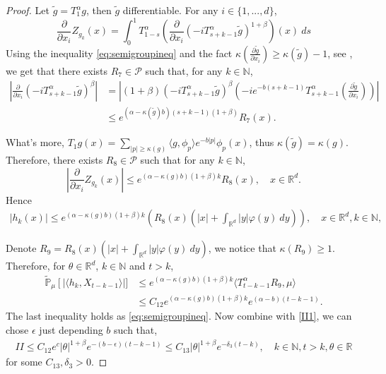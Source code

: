 \documentclass[12pt, a4paper]{amsart}
\theoremstyle{definition}
\numberwithin{equation}{section}
\begin{document}
\begin{proof}
    Let $\tilde{g}=T_1^{\alpha}g $, then $\tilde{g}$ differentiable. For any $i \in \{1,...,d\}$,
    $$\frac{\partial}{\partial x_i}Z_{g_k}(x)=\int_0^1 T^{\alpha}_{1-s}\left(\frac{\partial}{\partial x_i}(-i T_{s+k-1}^{\alpha} \tilde{g})^{1+\beta}\right)(x)~ds$$
    Using the inequality \eqref{eq:semigroupineq} and the fact $\kappa\left(\frac{\partial \tilde{g}}{\partial x_i}\right)\geq \kappa(\tilde{g})-1$, see \cite[Lemma 2.3]{RSZ}, we get that there exists $R_7 \in \mathcal{P}$ such that, for any $k\in \mathbb{N}$,
    \begin{align*}
        \left|\frac{\partial}{\partial x_i}(-i T_{s+k-1}^{\alpha}\tilde{g})^{\beta}\right|&=\left|(1+\beta)(-i T_{s+k-1}^{\alpha}\tilde{g})^{\beta}(-i e^{-b(s+k-1)}T_{s+k-1}^{\alpha}\left(\frac{\partial \tilde{g}}{\partial x_i}\right))\right|\\
        &\leq e^{(\alpha-\kappa(\tilde{g})b)(s+k-1)(1+\beta)}R_7(x).
    \end{align*}

    What's more, $T_1 g(x)=\sum_{|p|\geq\kappa(g)}\langle g,\phi_p\rangle e^{-b|p|}\phi_p(x)$, thus $\kappa(\tilde{g})=\kappa(g)$. Therefore, there exists $R_8 \in \mathcal{P}$ such that for any $k\in \mathbb{N}$,
    $$\left|\frac{\partial}{\partial x_i}Z_{g_k}(x)\right|\leq e^{(\alpha-\kappa(g)b)(1+\beta)k}R_8(x),\quad x\in \mathbb{R}^d. $$
    Hence
\begin{align}
    |h_k(x)|\leq e^{(\alpha-\kappa(g)b)(1+\beta)k}(R_8(x)(|x|+\int_{\mathbb{R}^d}|y|\varphi(y)~dy)),\quad  x\in \mathbb{R}^d, k\in\mathbb{N},
\end{align}

Denote $R_9=R_8(x)(|x|+\int_{\mathbb{R}^d}|y|\varphi(y)~dy)$, we notice that $\kappa(R_9)\geq1$. Therefore, for $\theta\in \mathbb{R}^d$, $k\in\mathbb{N}$ and $t>k$,
\begin{align*}
  \mathbb{\tilde{P}}_{\mu}\left[|\langle h_k,X_{t-k-1}\rangle\right|]&\leq e^{(\alpha-\kappa(g)b)(1+\beta)k}\langle T_{t-k-1}^{\alpha}R_9,\mu\rangle\\
  &\leq C_{12} e^{(\alpha-\kappa(g)b)(1+\beta)k}e^{(\alpha-b)(t-k-1)}.
\end{align*}
 The last inequality holds as \eqref{eq:semigroupineq}. Now combine with \eqref{II1}, we can chose $\epsilon$ just depending $b$ such that,
\begin{align}
    II\leq C_{12} e^c|\theta|^{1+\beta} e^{-(b-\epsilon)(t-k-1)}\leq C_{13}|\theta|^{1+\beta}e^{-\delta_3(t-k)},\quad k\in\mathbb{N},t>k,\theta\in\mathbb{R}\label{lemma32q}
\end{align}
for some $C_{13},\delta_3>0$.


\end{proof}
\end{document}
